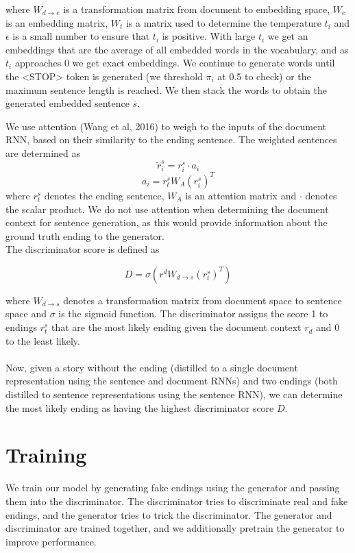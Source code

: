 \documentclass{article}
\begin{document}
where $W_{d \rightarrow e}$ is a transformation matrix from document to embedding space, $W_{e}$ is an embedding matrix, $W_{t}$ is a matrix used to determine the temperature $t_{i}$ and $\epsilon$ is a small number to ensure that $t_{i}$ is positive. With large $t_{i}$ we get an embeddings that are the average of all embedded words in the vocabulary, and as $t_{i}$ approaches 0 we get exact embeddings. We continue to generate words until the <STOP> token is generated (we threshold $\pi_{i}$ at 0.5 to check) or the maximum sentence length is reached. We then stack the words to obtain the generated embedded sentence $\bar{s}$.

We use attention (Wang et al, 2016) to weigh to the inputs of the document RNN, based on their similarity to the ending sentence. The weighted sentences are determined as
$$ \tilde{r}^{s}_{i} = r^{s}_{i} \cdot a_{i} $$
$$ a_{i} = r^{s}_{t}W_{A}(r^{s}_{i})^{T} $$
where $r^{s}_{t}$ denotes the ending sentence, $W_{A}$ is an attention matrix and $\cdot$ denotes the scalar product. We do not use attention when determining the document context for sentence generation, as this would provide information about the ground truth ending to the generator.\\ 

The discriminator score is defined as 

$$ D = \sigma(r^{d}W_{d \rightarrow s}(r^{s}_{t})^{T} )$$

where $W_{d \rightarrow s}$ denotes a transformation matrix from document space to sentence space and $\sigma$ is the sigmoid function. The discriminator assigns the score 1 to endings $r^{s}_{t}$ that are the most likely ending given the document context $r_{d}$ and 0 to the least likely. \\
\\
Now, given a story without the ending (distilled to a single document representation using the sentence and document RNNs) and two endings (both distilled to sentence representations using the sentence RNN), we can determine the most likely ending as having the highest discriminator score $D$. 

\section{Training}

We train our model by generating fake endings using the generator and passing them into the discriminator. The discriminator tries to discriminate real and fake endings, and the generator tries to trick the discriminator. The generator and discriminator are trained together, and we additionally pretrain the generator to improve performance.
\end{document}

